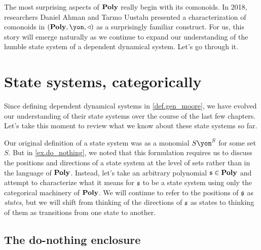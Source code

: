 \documentclass[Book-Poly]{subfiles}
\begin{document}

The most surprising aspects of $\mathbf{Poly}$ really begin with its comonoids.
In 2018, researchers Daniel Ahman and Tarmo Uustalu presented a characterization of comonoids in $(\poly,\yon,\tri)$ as a surprisingly familiar construct.
For us, this story will emerge naturally as we continue to expand our understanding of the humble state system of a dependent dynamical system.
Let's go through it.

\section{State systems, categorically}\label{sec.comon.sharp.state}

Since defining dependent dynamical systems in \cref{def.gen_moore}, we have evolved our understanding of their state systems over the course of the last few chapters. %
Let's take this moment to review what we know about these state systems so far. %

Our original definition of a state system was as a monomial $S\yon^S$ for some set $S$.
But in \cref{ex.do_nothing}, we noted that this formulation requires us to discuss the positions and directions of a state system at the level of sets rather than in the language of $\mathbf{Poly}$.
Instead, let's take an arbitrary polynomial $\mathfrak{s}\in\mathbf{Poly}$ and attempt to characterize what it means for $\mathfrak{s}$ to be a state system using only the categorical machinery of $\mathbf{Poly}$.
We will continue to refer to the positions of $\mathfrak{s}$ as \emph{states}, but we will shift from thinking of the directions of $\mathfrak{s}$ as states to thinking of them as transitions from one state to another.

\subsection{The do-nothing enclosure}\label{subsec.comon.sharp.state.nothing}
\end{document}
